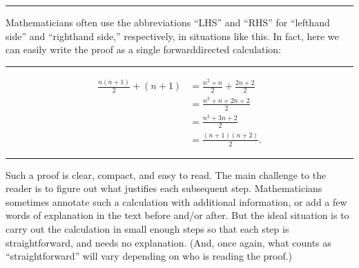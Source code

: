 \documentclass[letterpaper,10pt,english]{sphinxmanual}
\begin{document}
\bigskip\hrule\bigskip


\sphinxAtStartPar
Mathematicians often use the abbreviations “LHS” and “RHS” for “left\sphinxhyphen{}hand side” and “right\sphinxhyphen{}hand side,” respectively, in situations like this. In fact, here we can easily write the proof as a single forward\sphinxhyphen{}directed calculation:


\bigskip\hrule\bigskip


\sphinxAtStartPar
{}
\begin{equation*}
\begin{split}\frac{n(n+1)}{2} + (n + 1) & = \frac{n^2+n}{2} + \frac{2n + 2}{2} \\
  & = \frac{n^2+n + 2n + 2}{2} \\
  & = \frac{n^2 + 3n + 2}{2} \\
  & = \frac{(n+1)(n+2)}{2}.\end{split}
\end{equation*}

\bigskip\hrule\bigskip


\sphinxAtStartPar
Such a proof is clear, compact, and easy to read. The main challenge to the reader is to figure out what justifies each subsequent step. Mathematicians sometimes annotate such a calculation with additional information, or add a few words of explanation in the text before and/or after. But the ideal situation is to carry out the calculation in small enough steps so that each step is straightforward, and needs no explanation. (And, once again, what counts as “straightforward” will vary depending on who is reading the proof.)
\end{document}
